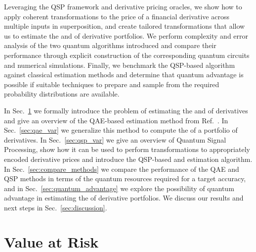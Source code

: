 Leveraging the QSP framework and derivative pricing oracles, we show how to apply coherent transformations to the price of a financial derivative across multiple inputs in superposition, and create tailored transformations that allow us to estimate the \var{} and \cvar{} of derivative portfolios.
We perform complexity and error analysis of the two quantum algorithms introduced and compare their performance through explicit construction of the corresponding quantum circuits and numerical simulations.
Finally, we benchmark the QSP-based algorithm against classical \var{} estimation methods and determine that quantum advantage is possible if suitable techniques to prepare and sample from the required probability distributions are available.


In Sec.~\ref{sec:derivative_var} we formally introduce the problem of estimating the \var{} and \cvar{} of derivatives and give an overview of the QAE-based \var{} estimation method from Ref.~\cite{Woerner_2019, egger2019credit}.
In Sec.~\ref{sec:qae_var} we generalize this method to compute the \var{} of a portfolio of derivatives.
In Sec.~\ref{sec:qsp_var} we give an overview of Quantum Signal Processing, show how it can be used to perform transformations to appropriately encoded derivative prices and introduce the QSP-based \var{} and \cvar{} estimation algorithm.
In Sec.~\ref{sec:compare_methods} we compare the performance of the QAE and QSP methods in terms of the quantum resources required for a target \var{} accuracy, and in Sec.~\ref{sec:quantum_advantage} we explore the possibility of quantum advantage in estimating the \var{} of derivative portfolios.
We discuss our results and next steps in Sec.~\ref{sec:discussion}.


\section{Value at Risk}
\label{sec:derivative_var}


